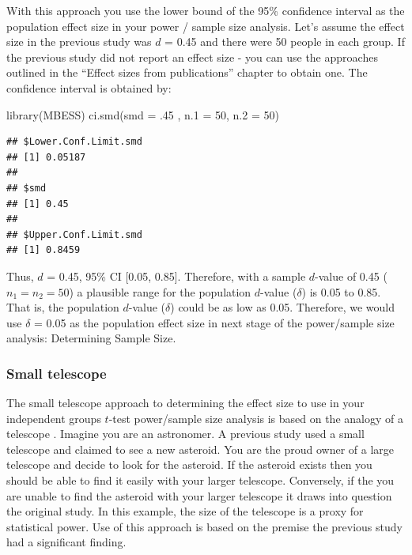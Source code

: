 \documentclass[
]{krantz}
\makeatletter
\newenvironment{Shaded}{\begin{snugshade}}{\end{snugshade}}
\newcommand{\AttributeTok}[1]{\textcolor[rgb]{0.61,0.61,0.61}{#1}}
\newcommand{\DecValTok}[1]{\textcolor[rgb]{0.06,0.06,0.06}{#1}}
\newcommand{\FunctionTok}[1]{\textcolor[rgb]{0,0,0}{#1}}
\newcommand{\NormalTok}[1]{#1}
\newenvironment{kframe}{%
\medskip{}
\setlength{\fboxsep}{.8em}
 \def\at@end@of@kframe{}%
 \ifinner\ifhmode%
  \def\at@end@of@kframe{\end{minipage}}%
  \begin{minipage}{\columnwidth}%
 \fi\fi%
 \def\FrameCommand##1{\hskip\@totalleftmargin \hskip-\fboxsep
 \colorbox{shadecolor}{##1}\hskip-\fboxsep
     \hskip-\linewidth \hskip-\@totalleftmargin \hskip\columnwidth}%
 \MakeFramed {\advance\hsize-\width
   \@totalleftmargin\z@ \linewidth\hsize
   \@setminipage}}%
 {\par\unskip\endMakeFramed%
 \at@end@of@kframe}
\renewenvironment{Shaded}{\begin{kframe}}{\end{kframe}}
\makeatother
\begin{document}
With this approach you use the lower bound of the 95\% confidence interval as the population effect size in your power / sample size analysis. Let's assume the effect size in the previous study was \(d\) = 0.45 and there were 50 people in each group. If the previous study did not report an effect size - you can use the approaches outlined in the ``Effect sizes from publications'' chapter to obtain one. The confidence interval is obtained by:

\begin{Shaded}
\begin{Highlighting}[]
\FunctionTok{library}\NormalTok{(MBESS)}
\FunctionTok{ci.smd}\NormalTok{(}\AttributeTok{smd =}\NormalTok{ .}\DecValTok{45}\NormalTok{ , }\AttributeTok{n.1 =} \DecValTok{50}\NormalTok{, }\AttributeTok{n.2 =} \DecValTok{50}\NormalTok{) }
\end{Highlighting}
\end{Shaded}

\begin{verbatim}
## $Lower.Conf.Limit.smd
## [1] 0.05187
## 
## $smd
## [1] 0.45
## 
## $Upper.Conf.Limit.smd
## [1] 0.8459
\end{verbatim}

Thus, \(d\) = 0.45, 95\% CI {[}0.05, 0.85{]}. Therefore, with a sample \(d\)-value of 0.45 (\(n_1=n_2=50\)) a plausible range for the population \(d\)-value (\(\delta\)) is 0.05 to 0.85. That is, the population \(d\)-value (\(\delta\)) could be as low as 0.05. Therefore, we would use \(\delta\) = 0.05 as the population effect size in next stage of the power/sample size analysis: Determining Sample Size.

\hypertarget{small-telescope}{%
\subsubsection{Small telescope}\label{small-telescope}}

The small telescope approach to determining the effect size to use in your independent groups \(t\)-test power/sample size analysis is based on the analogy of a telescope \citep{simonsohn2015small}. Imagine you are an astronomer. A previous study used a small telescope and claimed to see a new asteroid. You are the proud owner of a large telescope and decide to look for the asteroid. If the asteroid exists then you should be able to find it easily with your larger telescope. Conversely, if the you are unable to find the asteroid with your larger telescope it draws into question the original study. In this example, the size of the telescope is a proxy for statistical power. Use of this approach is based on the premise the previous study had a significant finding.
\end{document}
